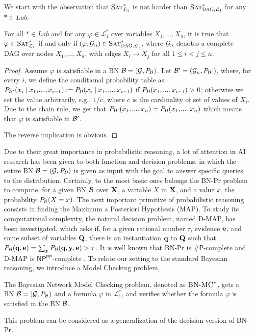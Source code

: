 \documentclass[a4paper,UKenglish,cleveref, autoref, thm-restate]{lipics-v2021}
\newcommand{\compactEquals}[1]{\let\IsInPP=1#1\let\IsInPP=\relax}
\newcommand{\NP}{\ensuremath{\mathsf{NP}}}
\newcommand{\ccPP}{\ensuremath{\mathsf{PP}}}
\newcommand{\sharpP}{\#\mathsf{P}}
\newcommand{\cL}{{\mathcal L}}
\newcommand{\bQ}{{\bf Q}}
\newcommand{\bX}{{\bf X}}
\newcommand{\cB}{{\cal B}}
\newcommand{\cG}{{\cal G}}
\newcommand{\be}{{\bf e}}
\newcommand{\bq}{{\bf q}}
\newcommand{\by}{{\bf y}}
\def\Lprobstar{\cL^{*}_{1}}
\def\Lab{\textit{Lab}}
\newcommand{\SATprobstar}{\mbox{\sc Sat}^{*}_{{\cL_1}}}
\newcommand{\SATprobstargraph}{\mbox{\sc Sat}^{*}_{\mbox{\scriptsize\sc DAG}, {\cL_1}}}
\newcommand{\SATprobstarBN}{\mbox{\sc BN-MC}^{*}}
\newcommand\myldots{\!\makebox[1em][c]{.\hfil.\hfil.}}
\begin{document}
We start with the observation that $\SATprobstar$ is not harder than $\SATprobstargraph$ for any $*\in \Lab$. \begin{proposition} \label{prop:DAG:notharder}
\label{fact:sat:sat_with_graph}
    For all  $*\in \Lab$ and 
    for any $\varphi\in \Lprobstar$ over variables $X_1,\ldots,X_n$,
    it is true that $\varphi\in\SATprobstar$ if and only if $(\varphi,\cG_n)\in\SATprobstargraph$,
    where $\cG_n$ denotes a complete DAG over nodes $X_1,\ldots,X_n$,
    with edges $X_i \to X_j$ for all $1\le i < j \le n$.
  \end{proposition}
  \begin{proof}Assume $\varphi$  is satisfiable in a BN $\cB=(\cG,P_{\cB})$.
Let $\cB'=(\cG_n,P_{\cB'})$, where, 
for every $i$, we define the conditional probability table as
$P_{\cB'}(x_i\mid x_1,\myldots,x_{i-1}):= P_{\cB}(x_i\mid x_1,\myldots,x_{i-1})$
if $P_{\cB}(x_1,\myldots,x_{i-1})>0$; otherwise we set the value arbitrarily, 
e.g., $1/c$, where $c$ is the cardinality of set of values of $X_i$.
Due to the chain rule, we get that 
$P_{\cB'}(x_1,\myldots,x_n)=P_{\cB}(x_1,\myldots,x_n)$
which means that $\varphi$  is satisfiable in  $\cB'$.

The reverse implication is obvious.
\end{proof}




Due to their great importance in probabilistic reasoning, a lot of attention in AI research has been given to both function 
and decision problems, in which the entire 
BN $\cB=(\cG,P_{\cB})$ is given as input with the goal to answer specific queries to the distribution. 
Certainly, to the most basic ones belongs the {\sc BN-Pr} problem to compute,
for a given BN $\cB$ over $\bX$, a variable $X$ in $\bX$, and a value $x$,
the probability $\compactEquals{P_{\cB}(X=x)}$. The next important 
primitive of probabilistic reasoning
consists in finding the Maximum a Posteriori Hypothesis (MAP).
To study its computational complexity, the natural decision problem, named {\sc D-MAP},
has been investigated, which asks if, for a given rational number $\tau$, evidence $\be$, 
and some subset of variables $\bQ$, there is an instantiation $\bq$ to $\bQ$ such that 
$P_{\cB}(\bq,\be) = \sum_{\by} P_{\cB}(\bq,\by,\be)>\tau$.
It is well known that {\sc BN-Pr} is $\sharpP$-complete and 
{\sc D-MAP} is \NP$^{\ccPP}$-complete \cite{roth1996hardness,park2004complexity}.
To relate our setting to the standard Bayesian reasoning, we introduce 
a Model Checking problem,
\begin{definition}
The Bayesian Network Model Checking problem, denoted as $\SATprobstarBN$, 
gets a BN $\cB=(\cG,P_{\cB})$ and a formula $\varphi$ in $\Lprobstar$,
and verifies whether the formula $\varphi$ is satisfied in the BN $\cB$. 
\end{definition}
This problem can be considered as a generalization of the decision version of {\sc BN-Pr}.
\end{document}
